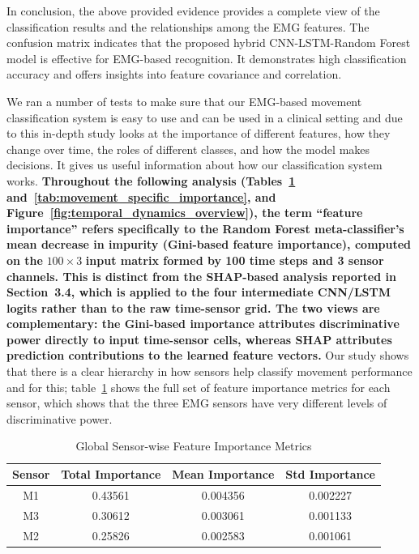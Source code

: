 \documentclass{elektr}
\newcommand{\yh}[1]{{\color{revhi}\textbf{#1}}}
\begin{document}
In conclusion, the above provided evidence provides a complete view of the classification results and the relationships among the EMG features. The confusion matrix indicates that the proposed hybrid CNN-LSTM-Random Forest model is effective for EMG-based recognition. It demonstrates high classification accuracy and offers insights into feature covariance and correlation.

We ran a number of tests to make sure that our EMG-based movement classification system is easy to use and can be used in a clinical setting and due to this in-depth study looks at the importance of different features, how they change over time, the roles of different classes, and how the model makes decisions. It gives us useful information about how our classification system works.
\yh{Throughout the following analysis (Tables~\mbox{\ref{tab:global_sensor_importance}} and~\mbox{\ref{tab:movement_specific_importance}}, and Figure~\mbox{\ref{fig:temporal_dynamics_overview}}), the term ``feature importance'' refers specifically to the Random Forest meta-classifier's mean decrease in impurity (Gini-based feature importance), computed on the }$100 \times 3$\yh{ input matrix formed by 100 time steps and 3 sensor channels. This is distinct from the SHAP-based analysis reported in Section~3.4, which is applied to the four intermediate CNN/LSTM logits rather than to the raw time-sensor grid. The two views are complementary: the Gini-based importance attributes discriminative power directly to input time-sensor cells, whereas SHAP attributes prediction contributions to the learned feature vectors.}
Our study shows that there is a clear hierarchy in how sensors help classify movement performance and for this; table~\ref{tab:global_sensor_importance} shows the full set of feature importance metrics for each sensor, which shows that the three EMG sensors have very different levels of discriminative power.
\begin{table}[h]
	\centering
	\caption{Global Sensor-wise Feature Importance Metrics}
	\label{tab:global_sensor_importance}
	\begin{tabular}{|c|c|c|c|}
		\hline
		\textbf{Sensor} & \textbf{Total Importance} & \textbf{Mean Importance} & \textbf{Std Importance} \\
		\hline
		M1 & 0.43561 & 0.004356 & 0.002227 \\
		M3 & 0.30612 & 0.003061 & 0.001133 \\
		M2 & 0.25826 & 0.002583 & 0.001061 \\
		\hline
	\end{tabular}
\end{table}
\end{document}
